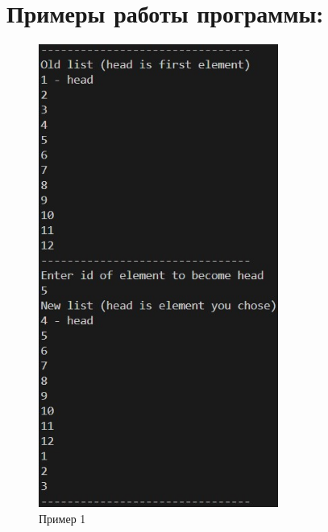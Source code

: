 \documentclass[a4paper,12pt]{report}
\begin{document}
\section*{Примеры работы программы:}
\begin{figure}[ph]
    \includegraphics[width=0.7\textwidth]{ex1.jpg}
\caption{Пример 1}
\label{ris:image1}
\end{figure}
\end{document}
